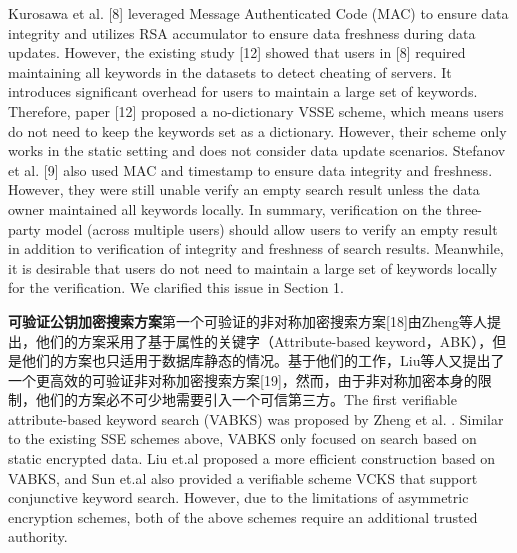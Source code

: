 Kurosawa et al. [8] leveraged Message Authenticated Code (MAC) to ensure data integrity and utilizes RSA accumulator to ensure data freshness during data updates. However, the existing study [12] showed that users in [8] required maintaining all keywords in the datasets to detect cheating of servers. It introduces significant overhead for users to maintain a large set of keywords. Therefore, paper [12] proposed a no-dictionary VSSE scheme, which means users do not need to keep the keywords set as a dictionary. However, their scheme only works in the static setting and does not consider data update scenarios.
Stefanov et al. [9] also used MAC and timestamp to ensure data integrity and freshness. However, they were still unable verify an empty search result unless the data owner maintained all keywords locally.
In summary, verification on the three-party model (across multiple users) should allow users to verify an empty result in addition to verification of integrity and freshness of search results. Meanwhile, it is desirable that users do not need to maintain a large set of keywords locally for the verification. We clarified this issue in Section 1.

\noindent\textbf{可验证公钥加密搜索方案}第一个可验证的非对称加密搜索方案[18]由Zheng等人提出，他们的方案采用了基于属性的关键字（Attribute-based keyword，ABK），但是他们的方案也只适用于数据库静态的情况。基于他们的工作，Liu等人又提出了一个更高效的可验证非对称加密搜索方案[19]，然而，由于非对称加密本身的限制，他们的方案必不可少地需要引入一个可信第三方。The first verifiable attribute-based keyword search (VABKS) was proposed by Zheng et al. \cite{zheng2014vabks}. Similar to the existing SSE schemes above, VABKS only focused on search based on static encrypted data. Liu et.al \cite{liu2014efficient} proposed a more efficient construction based on VABKS, and Sun et.al \cite{sun2015catch} also provided a verifiable scheme VCKS that support conjunctive keyword search. However, due to the limitations of asymmetric encryption schemes, both of the above schemes require an additional trusted authority.

